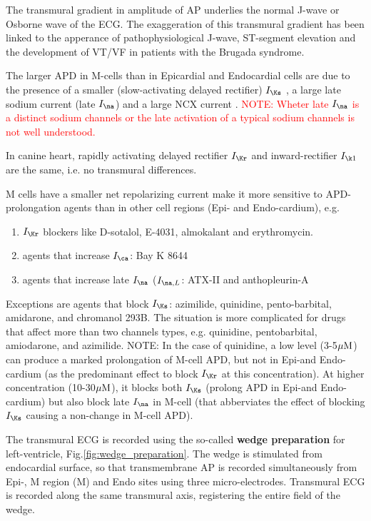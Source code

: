 The transmural gradient in amplitude of AP  underlies the normal J-wave or
Osborne wave of the ECG. The exaggeration of this transmural gradient has been
linked to the apperance of pathophysiological J-wave, ST-segment elevation and
the development of VT/VF in patients with the Brugada syndrome.

The larger APD in M-cells than in Epicardial and Endocardial cells are due to
the presence of a smaller (slow-activating delayed rectifier) $I_\Ks$
\citep{liu1995}, a large late sodium current (late $I_\na$)  
\cite{antzelevitch1999} and a large NCX current \citep{zygmunt2000}.
\textcolor{red}{NOTE: Wheter late $I_\na$ is a distinct sodium channels or the
late activation of a typical sodium channels is not well understood.}

\begin{framed}
In canine heart, rapidly activating delayed rectifier $I_\Kr$ and
inward-rectifier $I_{\k1}$ are the same, i.e. no transmural differences. 
\end{framed}


M cells have a smaller net repolarizing current make it more sensitive to
APD-prolongation agents than in other cell regions (Epi- and Endo-cardium), e.g.
\begin{enumerate}
  \item $I_\Kr$ blockers like D-sotalol, E-4031, almokalant and erythromycin.
  \item agents that increase $I_\ca$: Bay K 8644
  \item agents that increase late $I_\na$ ($I_{\na,L}$: ATX-II and
  anthopleurin-A
\end{enumerate} 
Exceptions are agents that block $I_\Ks$: azimilide, quinidine, pento-barbital,
amidarone, and chromanol 293B. The situation is more complicated for drugs that
affect more than two channels types, e.g. quinidine, pentobarbital, amiodarone,
and azimilide. NOTE: In the case of quinidine, a low level (3-5${\mu\text{M}}$) can
produce a marked prolongation of M-cell APD, but not in Epi-and Endo-cardium
(as the predominant effect to block $I_\Kr$ at this concentration). At higher
concentration (10-30${\mu\text{M}}$), it blocks both $I_\Ks$ (prolong APD in Epi-and
Endo-cardium) but also block late $I_\na$ in M-cell (that abberviates the
effect of blocking $I_\Ks$ causing a non-change in M-cell APD).

The transmural ECG is recorded using the so-called {\bf wedge preparation} for
left-ventricle, Fig.\ref{fig:wedge_preparation}. The wedge is stimulated from
endocardial surface, so that transmembrane AP is recorded simultaneously from
Epi-, M region (M) and Endo sites using three micro-electrodes. Transmural ECG
is recorded along the same transmural axis, registering the entire field of the
wedge. 

